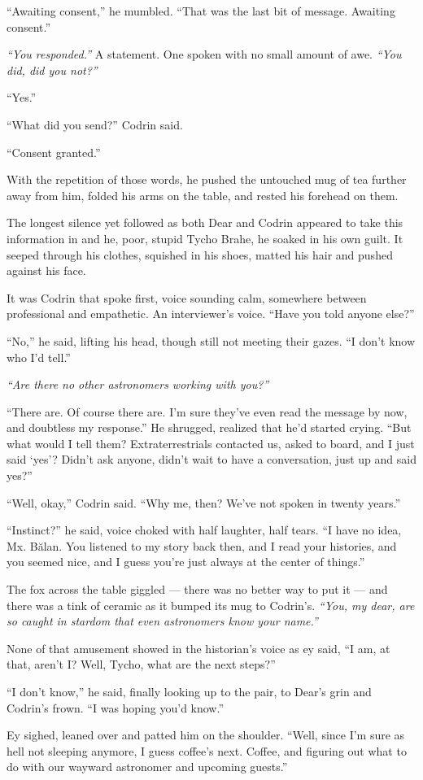 ``Awaiting consent,'' he mumbled. ``That was the last bit of message. Awaiting consent.''

\emph{``You responded.''} A statement. One spoken with no small amount of awe. \emph{``You did, did you not?''}

``Yes.''

``What did you send?'' Codrin said.

``Consent granted.''

With the repetition of those words, he pushed the untouched mug of tea further away from him, folded his arms on the table, and rested his forehead on them.

The longest silence yet followed as both Dear and Codrin appeared to take this information in and he, poor, stupid Tycho Brahe, he soaked in his own guilt. It seeped through his clothes, squished in his shoes, matted his hair and pushed against his face.

It was Codrin that spoke first, voice sounding calm, somewhere between professional and empathetic. An interviewer's voice. ``Have you told anyone else?''

``No,'' he said, lifting his head, though still not meeting their gazes. ``I don't know who I'd tell.''

\emph{``Are there no other astronomers working with you?''}

``There are. Of course there are. I'm sure they've even read the message by now, and doubtless my response.'' He shrugged, realized that he'd started crying. ``But what would I tell them? Extraterrestrials contacted us, asked to board, and I just said `yes'? Didn't ask anyone, didn't wait to have a conversation, just up and said yes?''

``Well, okay,'' Codrin said. ``Why me, then? We've not spoken in twenty years.''

``Instinct?'' he said, voice choked with half laughter, half tears. ``I have no idea, Mx. Bălan. You listened to my story back then, and I read your histories, and you seemed nice, and I guess you're just always at the center of things.''

The fox across the table giggled — there was no better way to put it — and there was a tink of ceramic as it bumped its mug to Codrin's. \emph{``You, my dear, are so caught in stardom that even astronomers know your name.''}

None of that amusement showed in the historian's voice as ey said, ``I am, at that, aren't I? Well, Tycho, what are the next steps?''

``I don't know,'' he said, finally looking up to the pair, to Dear's grin and Codrin's frown. ``I was hoping you'd know.''

Ey sighed, leaned over and patted him on the shoulder. ``Well, since I'm sure as hell not sleeping anymore, I guess coffee's next. Coffee, and figuring out what to do with our wayward astronomer and upcoming guests.''
